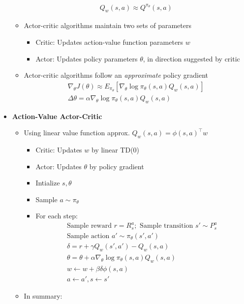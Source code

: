\documentclass[12pt]{article}
\begin{document}
\begin{itemize}
\begin{itemize}
\begin{gather*}
      Q_w(s,a) \approx Q^{\pi_\theta}(s,a)
    \end{gather*}
    \item Actor-critic algorithms maintain two sets of parameters 
    \begin{itemize}
      \item Critic: Updates action-value function parameters $w$
      \item Actor: Updates policy parameters $\theta$, in direction suggested by critic
    \end{itemize}
    \item Actor-critic algorithms follow an \textit{approximate} policy gradient
    \begin{gather*}
      \nabla_\theta J(\theta) \approx E_{\pi_\theta} [\nabla_\theta \log \pi_\theta (s,a) Q_w(s,a)] \\
      \Delta \theta = \alpha \nabla_\theta \log \pi_\theta (s,a) Q_w(s,a)
    \end{gather*}
  \end{itemize}
  \item \textbf{Action-Value Actor-Critic}
  \begin{itemize}
    \item Using linear value function approx. $Q_w(s,a) = \phi(s,a)^\top w$
    \begin{itemize}
      \item Critic: Updates $w$ by linear TD(0)
      \item Actor: Updates $\theta$ by policy gradient
      \item Intialize $s, \theta$
      \item Sample $a \sim \pi_\theta$
      \item For each step:
      \begin{gather*}
        \mbox{Sample reward } r = R_s^a; \mbox{ Sample transition } s' \sim P_s^a \\
        \mbox{Sample action } a' \sim \pi_\theta(s', a') \\
        \delta = r + \gamma Q_w(s', a') - Q_w(s, a) \\
        \theta = \theta + \alpha \nabla_\theta \log \pi_\theta (s,a) Q_w(s,a) \\
        w \leftarrow w + \beta \delta \phi(s,a) \\
        a \leftarrow a', s \leftarrow s'
      \end{gather*}
    \end{itemize}
    \item In summary:

\end{itemize}
\end{itemize}
\end{document}
